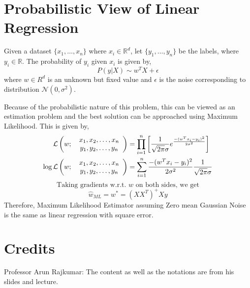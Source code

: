 \documentclass[
]{article}
\begin{document}
\hypertarget{probabilistic-view-of-linear-regression}{%
\section{Probabilistic View of Linear
Regression}\label{probabilistic-view-of-linear-regression}}

Given a dataset \(\{x_1, \ldots, x_n\}\) where \(x_i \in \mathbb{R}^d\),
let \(\{y_1, \ldots, y_n\}\) be the labels, where
\(y_i \in \mathbb{R}\). The probability of \(y_i\) given \(x_i\) is
given by, \[
P(y|X) \sim w^TX + \epsilon
\] where \(w \in R^d\) is an unknown but fixed value and \(\epsilon\) is
the noise corresponding to distribution \(\mathcal{N}(0, \sigma^2)\).

Because of the probabilistic nature of this problem, this can be viewed
as an estimation problem and the best solution can be approached using
Maximum Likelihood. This is given by, \begin{align*}
\mathcal{L}\left(w; \hspace{0.5em} \begin{array}{cccc}
x_1, x_2, \ldots, x_n \\
y_1, y_2, \ldots, y_n\\
\end{array} \right )
&= \prod _{i=1} ^n \left [ \frac{1}{\sqrt{2\pi}\sigma}  e^{\frac{-(w^Tx_i - y_i)^2}{2\sigma^2}} \right ] \\
\log\mathcal{L}\left(w; \hspace{0.5em} \begin{array}{cccc}
x_1, x_2, \ldots, x_n \\
y_1, y_2, \ldots, y_n\\
\end{array} \right )
&= \sum _{i=1} ^n \frac{-(w^Tx_i - y_i)^2}{2\sigma^2} \frac{1}{\sqrt{2\pi}\sigma}
\end{align*} \[
\text{Taking gradients w.r.t. } w \text{ on both sides, we get}
\] \[
\hat{w}_{ML} = w^* = (XX^T)^+Xy
\] Therefore, Maximum Likelihood Estimator assuming Zero mean Gaussian
Noise is the same as linear regression with square error.

\hypertarget{credits}{%
\section{Credits}\label{credits}}

Professor Arun Rajkumar: The content as well as the notations are from
his slides and lecture.
\end{document}
